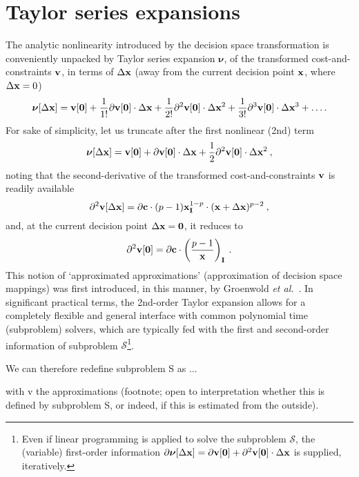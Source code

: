 \documentclass[11pt]{article}
\begin{document}
\section{Taylor series expansions}

The analytic nonlinearity introduced by the decision space transformation is conveniently unpacked by Taylor series expansion $\bm{\nu}$, of the transformed cost-and-constraints $\mathbf{v}$, in terms of $\Delta \mathbf{x}$ (away from the current decision point $\mathbf{x}$, where $\Delta \mathbf{x}=0$)
\begin{equation}
\bm{\nu}[\Delta \mathbf{x}] = \mathbf{v}[\mathbf{0}] + \frac{1}{1!}\partial \mathbf{v}[\mathbf{0}] \cdot  \Delta \mathbf{x} + \frac{1}{2!}\partial^2 \mathbf{v} [\mathbf{0}] \cdot \Delta \mathbf{x}^2 + \frac{1}{3!}\partial^3 \mathbf{v}[\mathbf{0}] \cdot \Delta \mathbf{x}^3 + \ldots .
\end{equation}
For sake of simplicity, let us truncate after the first nonlinear (2nd) term
\begin{equation}
\bm{\nu}[\Delta \mathbf{x}] = \mathbf{v}[\mathbf{0}] + \partial \mathbf{v}[\mathbf{0}] \cdot \Delta \mathbf{x} + \frac{1}{2}\partial^2 \mathbf{v}[\mathbf{0}] \cdot  \Delta \mathbf{x}^2 \: , 
\end{equation}
noting that the second-derivative of the transformed cost-and-constraints $\mathbf{v}$ is readily available
\begin{equation}
\partial^2 \mathbf{v}[\Delta \mathbf{x}] = \partial \mathbf{c} \cdot (p-1)\mathbf{x}_{\mathbf{I}}^{1-p} \cdot (\mathbf{x}+\Delta\mathbf{x})^{p-2} \: ,
\end{equation}
and, at the current decision point $\Delta \mathbf{x} = \mathbf{0}$, it reduces to
\begin{equation}
\partial^2 \mathbf{v}[\mathbf{0}] = \partial \mathbf{c} \cdot \left(\frac{p-1}{\mathbf{x}}\right)_{\mathbf{I}} \: .
\end{equation}
This notion of `approximated approximations' (approximation of decision space mappings) was first introduced, in this manner, by Groenwold \emph{et al.}~\cite{groenwold2010approximated}. In significant practical terms, the 2nd-order Taylor expansion allows for a completely flexible and general interface with common polynomial time (subproblem) solvers, which are typically fed with the first and second-order information of subproblem $\mathcal{S}$\footnote{Even if linear programming is applied to solve the subproblem $\mathcal{S}$, the (variable) first-order information $\partial \bm{\nu} [\Delta \mathbf{x}] = \partial \mathbf{v}[\mathbf{0}] + \partial^2 \mathbf{v}[\mathbf{0}] \cdot \Delta \mathbf{x}$ is supplied, iteratively.}. 

We can therefore redefine subproblem S as ... 

with v the approximations (footnote; open to interpretation whether this is defined by subproblem S, or indeed, if this is estimated from the outside). 
\end{document}
